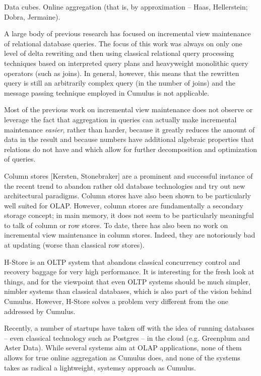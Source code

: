 Data cubes. Online aggregation (that is, by approximation -- Haas, Hellerstein;
Dobra, Jermaine).


A large body of previous research has focused on incremental view maintenance
of relational database queries. The
focus of this work was always on only one level of delta rewriting
and then using classical relational query processing techniques
based on interpreted query plans and heavyweight monolithic query operators
(such as joins).
In general, however, this means
that the rewritten query is still an arbitrarily complex query (in the number
of joins) and the message passing technique employed in Cumulus is not
applicable.


Most of the previous work on incremental view maintenance does not observe or leverage the fact that aggregation in queries can actually make incremental maintenance {\em easier}, rather than harder, because it greatly reduces the amount of data in the result and because numbers have additional algebraic properties that relations do not have and which allow for further decomposition and optimization of queries.


Column stores [Kersten, Stonebraker] are a prominent and successful
instance of the recent trend
to abandon rather old database technologies and try out new architectural
para\-digms. Column stores have also been shown to be particularly well suited
for OLAP. However, column stores are fundamentally a secondary storage
concept; in main memory, it does not seem to be particularly meaningful to talk of column or row stores. To date, there has also been no work
on incremental view maintenance in column stores.
Indeed, they are notoriously bad at updating (worse than classical row stores).

H-Store is an OLTP system that abandons classical concurrency control and
recovery baggage for very high performance. It is interesting for the
fresh look at things, and for the viewpoint that even OLTP systems should
be much simpler, nimbler systems than classical databases, which is also
part of the vision behind Cumulus. However, H-Store solves a problem very
different from the one addressed by Cumulus.

Recently, a number of startups have taken off with the idea of running
databases -- even classical technology such as Postgres -- in the cloud
(e.g. Greenplum and Aster Data). While several systems aim at OLAP
applications, none of them allows for true online aggregation as Cumulus does,
and none of the systems takes as radical a lightweight, systemsy approach
as Cumulus.



